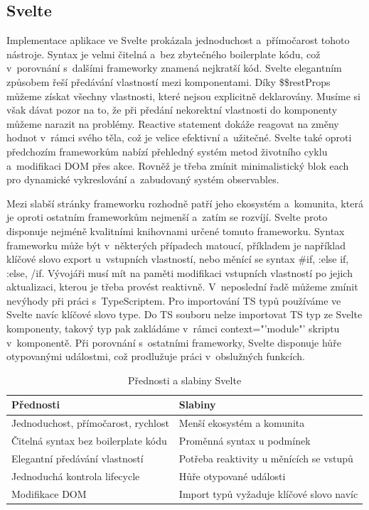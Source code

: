 \subsection*{Svelte}

Implementace aplikace ve Svelte prokázala jednoduchost a~přímočarost tohoto nástroje. 
Syntax je velmi čitelná a~bez zbytečného boilerplate kódu, což v~porovnání s~dalšími frameworky znamená nejkratší kód. 
Svelte elegantním způsobem řeší předávání vlastností mezi komponentami. 
Díky \$\$restProps můžeme získat všechny vlastnosti, které nejsou explicitně deklarovány. 
Musíme si však dávat pozor na to, že při předání nekorektní vlastnosti do komponenty můžeme narazit na problémy. 
Reactive statement dokáže reagovat na změny hodnot v~rámci svého těla, což je velice efektivní a~užitečné. 
Svelte také oproti předchozím frameworkům nabízí přehledný systém metod životního cyklu a~modifikaci DOM přes akce. 
Rovněž je třeba zmínit minimalistický blok each pro dynamické vykreslování a~zabudovaný systém observables. 

Mezi slabší stránky frameworku rozhodně patří jeho ekosystém a~komunita, která je oproti ostatním frameworkům nejmenší a~zatím se rozvíjí. 
Svelte proto disponuje nejméně kvalitními knihovnami určené tomuto frameworku. 
Syntax frameworku může být v~některých případech matoucí, příkladem je například klíčové slovo export u~vstupních vlastností, nebo měnící se syntax \#if, :else if, :else, /if. 
Vývojáři musí mít na paměti modifikaci vstupních vlastností po jejich aktualizaci, kterou je třeba provést reaktivně. 
V~neposlední řadě můžeme zmínit nevýhody při práci s~TypeScriptem. Pro importování TS typů používáme ve Svelte navíc klíčové slovo type. 
Do TS souboru nelze importovat TS typ ze Svelte komponenty, takový typ pak zakládáme v~rámci context="'module"' skriptu v~komponentě.
Při porovnání s~ostatními frameworky, Svelte disponuje hůře otypovanými událostmi, což prodlužuje práci v~obslužných funkcích.

\begin{table}[htb]
	\centering
	\caption{Přednosti a slabiny Svelte}
	\medskip
	\radkovani[1.2]
		\begin{tabular}{|l|l|}
		\hline
		\textbf{Přednosti}									& \textbf{Slabiny}                    			\\ \hline
		Jednoduchost, přímočarost, rychlost & Menší ekosystém a komunita              	\\ \hline
		Čitelná syntax bez boilerplate kódu	& Proměnná syntax u podmínek  							\\ \hline
		Elegantní předávání vlastností			& Potřeba reaktivity u měnících se vstupů		\\ \hline
		Jednoduchá kontrola lifecycle				& Hůře otypované události										\\ \hline
		Modifikace DOM											& Import typů vyžaduje klíčové slovo navíc	\\ \hline
		\end{tabular}
	\label{tab:sveltetabulka}
\end{table}

